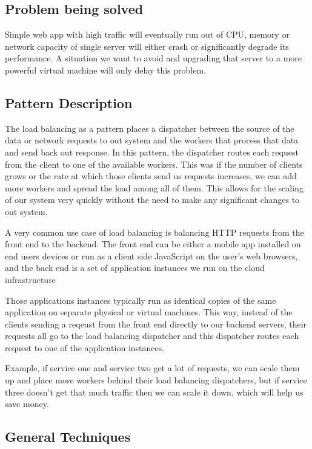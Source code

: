 \documentclass[a4paper, 11pt]{book}
\begin{document}
    \subsection{Problem being solved}
    Simple web app with high traffic will eventually run out of CPU, memory or network capacity of single server will either crash or significantly degrade its performance.
    A situation we want to avoid and upgrading that server to a more powerful virtual machine will only delay this problem.

    \subsection{Pattern Description}
    The load balancing as a pattern places a dispatcher between the source of the data or network requests to out system and the workers that process that data and send back out response.
    In this pattern, the dispatcher routes each request from the client to one of the available workers.
    This was if the number of clients grows or the rate at which those clients send us requests increases, we can add more workers and spread the load among all of them.
    This allows for the scaling of our system very quickly without the need to make any significant changes to out system.

    A very common use case of load balancing is balancing HTTP requests from the front end to the backend.
    The front end can be either a mobile app installed on end users devices or run as a client side JavaScript on the user's web browsers,
    and the back end is a set of application instances we run on the cloud infrastructure

    Those applications instances typically run as identical copies of the same application on separate physical or virtual machines.
    This way, instead of the clients sending a reqeust from the front end directly to our backend servers, their requests all go to the load balancing dispatcher and this dispatcher routes each request to one of the application instances.

    Example, if service one and service two get a lot of requests, we can scale them up and place more workers behind their load balancing dispatchers, but if service three doesn't get that much traffic then we can scale it down, which will help us save money.

    \subsection{General Techniques}
\end{document}
